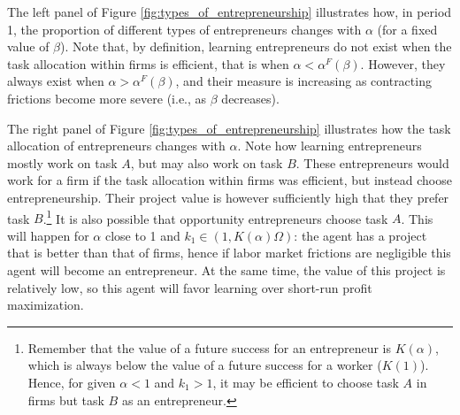 \documentclass[12pt,american]{paper}
\theoremstyle{remark}
\begin{document}
The left panel of Figure \ref{fig:types_of_entrepreneurship} illustrates how, in period 1, the proportion of different types of entrepreneurs changes with $\alpha$ (for a fixed value of $\beta$). Note that, by definition, learning entrepreneurs do not exist when the task allocation within firms is efficient, that is when $\alpha<\alpha^F(\beta)$. However, they always exist when  $\alpha>\alpha^F(\beta)$, and their measure is increasing as contracting frictions become more severe (i.e., as $\beta$ decreases). 

The right panel of Figure \ref{fig:types_of_entrepreneurship} illustrates how the task allocation of entrepreneurs changes with $\alpha$. Note how learning entrepreneurs mostly work on task $A$, but may also work on task $B$. These entrepreneurs would work for a firm if the task allocation within firms was efficient, but instead choose entrepreneurship. Their project value is however sufficiently high that they prefer task $B$.\footnote{Remember that the value of a future success for an entrepreneur is $K(\alpha)$, which is always below the value of a future success for a worker ($K(1)$). Hence, for given $\alpha<1$ and $k_1>1$, it may be efficient to choose task $A$ in firms but task $B$ as an entrepreneur.} It is also possible that opportunity entrepreneurs choose task $A$. This will happen for $\alpha$ close to 1 and $k_1\in(1,K(\alpha)\Omega)$: the agent has a project that is better than that of firms, hence if labor market frictions are negligible this agent will become an entrepreneur. At the same time, the value of this project is relatively low, so this agent will favor learning over short-run profit maximization.  
\end{document}
